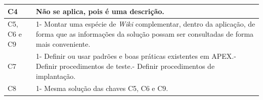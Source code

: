 \begin{longtable}{|M{2.0cm}|m{13.0cm}|}
C4                                               & Não se aplica, pois é uma descrição.                                                                                                                                                                                                                                                                                                                                                                                                                                                                                                                           \\ \hline
C5, C6 e C9                                      & 1- Montar uma espécie de \textit{Wiki} complementar, dentro da aplicação, de forma que as informações da solução possam ser consultadas de forma mais conveniente.                                                                                                                                                                                                                                                                                                                                                                                                         \\ \hline
C7                                                & 1- Definir ou usar padrões e boas práticas existentes em APEX.- Definir procedimentos de teste.- Definir procedimentos de implantação.                                                                                                                                                                                                                                                                                                                                                                        \\ \hline
C8                                                & 1- Mesma solução das chaves C5, C6 e C9.                                                                                                                                                                                                                                                                                                                                                                                                                                                                                                                 \\ \hline

\end{longtable}
